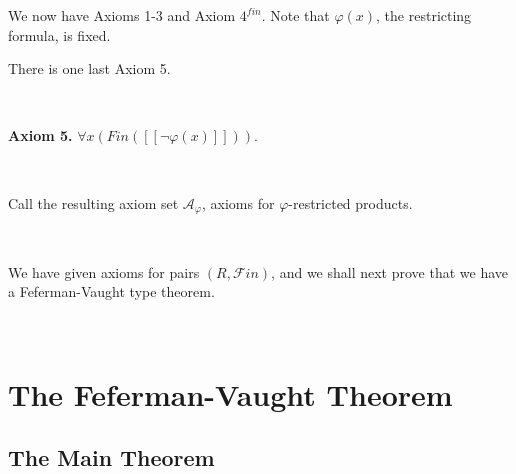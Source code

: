\documentclass[12pt]{amsart}
\def\cA{\mathcal{A}}
\numberwithin{equation}{section}
\begin{document}
We now have Axioms 1-3 and Axiom $4^{fin}$. Note that $\varphi(x)$, the restricting formula, is fixed.

There is one last Axiom 5.

\

{\bf Axiom 5.} $\forall x (Fin([[\neg \varphi(x)]]))$.

\

Call the resulting axiom set $\cA_{\varphi}$, axioms for $\varphi$-restricted products.

\

We have given axioms for pairs $(R, \mathcal{F}in)$, and we shall next prove that we have a Feferman-Vaught type theorem.

\

\section{\bf The Feferman-Vaught Theorem}

\subsection{The Main Theorem}
\end{document}

